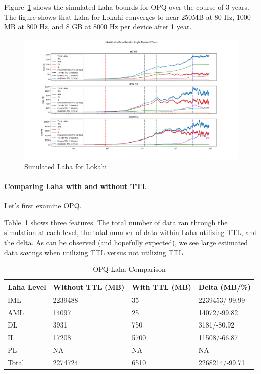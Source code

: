Figure~\ref{fig:sim_laha_lokahi} shows the simulated Laha bounds for OPQ over the course of 3 years. The figure shows that Laha for Lokahi converges to near 250MB at 80 Hz, 1000 MB at 800 Hz, and 8 GB at 8000 Hz per device after 1 year.

\begin{figure}[H]
	\centering
	\includegraphics[width=\linewidth]{figures/sim_laha_lokahi.png}
	\caption{Simulated Laha for Lokahi}
	\label{fig:sim_laha_lokahi}
\end{figure}


\paragraph{Comparing Laha with and without TTL}

Let's first examine OPQ\@.

Table~\ref{table:opq_laha_comparison} shows three features. The total number of data ran through the simulation at each level, the total number of data within Laha utilizing TTL, and the delta. As can be observed (and hopefully expected), we see large estimated data savings when utilizing TTL versus not utilizing TTL\@.

\begin{table}[H]
	\centering
	\caption{OPQ Laha Comparison}
	\begin{tabularx}{\textwidth}{Xlll}
		\toprule
		\textbf{Laha Level} & \textbf{Without TTL (MB)} & \textbf{With TTL (MB)} & \textbf{Delta (MB/\%)} \\
		\midrule
		IML & 2239488 & 35 & 2239453/-99.99 \\
		AML & 14097 & 25 & 14072/-99.82\\
		DL & 3931 & 750 & 3181/-80.92 \\
		IL & 17208 & 5700 & 11508/-66.87 \\
		PL & NA & NA & NA \\
		Total & 2274724 & 6510 & 2268214/-99.71 \\
		\bottomrule
	\end{tabularx}
	\label{table:opq_laha_comparison}
\end{table}

